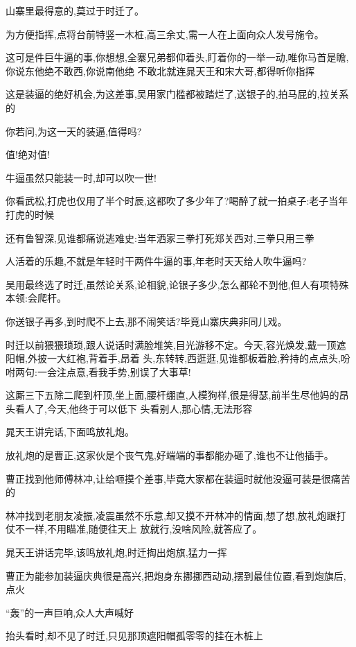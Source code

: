 ﻿\documentclass[12pt]{article}
\begin{document}
山寨里最得意的,莫过于时迁了。

为方便指挥,点将台前特竖一木桩,高三余丈,需一人在上面向众人发号施令。

这可是件巨牛逼的事,你想想,全寨兄弟都仰着头,盯着你的一举一动,唯你马首是瞻,你说东他绝不敢西,你说南他绝
不敢北\dldots 就连晁天王和宋大哥,都得听你指挥\dldots

这是装逼的绝好机会,为这差事,吴用家门槛都被踏烂了,送银子的,拍马屁的,拉关系的\dldots

你若问,为这一天的装逼,值得吗?

值!绝对值!

牛逼虽然只能装一时,却可以吹一世!

你看武松,打虎也仅用了半个时辰,这都吹了多少年了?喝醉了就一拍桌子:老子当年打虎的时候\dldots

还有鲁智深,见谁都痛说逃难史:当年洒家三拳打死郑关西\dldots 对,三拳\dldots 只用三拳\dldots

人活着的乐趣,不就是年轻时干两件牛逼的事,年老时天天给人吹牛逼吗?

吴用最终选了时迁,虽然论关系,论相貌,论银子多少,怎么都轮不到他,但人有项特殊本领:会爬杆。

你送银子再多,到时爬不上去,那不闹笑话?毕竟山寨庆典非同儿戏。

时迁以前猥猥琐琐,跟人说话时满脸堆笑,目光游移不定。今天,容光焕发,戴一顶遮阳帽,外披一大红袍,背着手,昂着
头,东转转,西逛逛,见谁都板着脸,矜持的点点头,吩咐两句:一会注点意,看我手势,别误了大事\dldots 草!

这厮三下五除二爬到杆顶,坐上面,腰杆绷直,人模狗样,很是得瑟,前半生尽他妈的昂头看人了,今天,他终于可以低下
头看别人,那心情,无法形容\dldots

晁天王讲完话,下面鸣放礼炮。

放礼炮的是曹正,这家伙是个丧气鬼,好端端的事都能办砸了,谁也不让他插手。

曹正找到他师傅林冲,让给咂摸个差事,毕竟大家都在装逼时就他没逼可装是很痛苦的

林冲找到老朋友凌振,凌震虽然不乐意,却又摸不开林冲的情面,想了想,放礼炮跟打仗不一样,不用瞄准,随便往天上
放就行,没啥风险,就答应了。

晁天王讲话完毕,该鸣放礼炮,时迁掏出炮旗,猛力一挥

曹正为能参加装逼庆典很是高兴,把炮身东挪挪西动动,摆到最佳位置,看到炮旗后,点火\dldots

``轰''的一声巨响,众人大声喊好

抬头看时,却不见了时迁,只见那顶遮阳帽孤零零的挂在木桩上\dldots
\section{}
\end{document}
